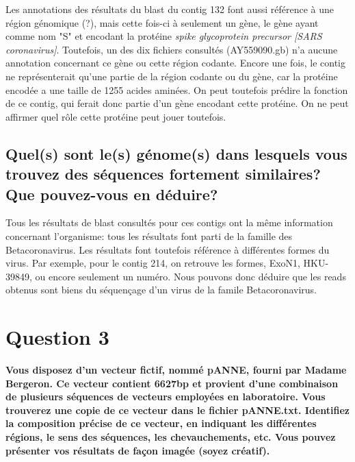 \documentclass[11pt]{article} %
\begin{document}
Les annotations des résultats du blast du contig 132 font aussi référence à une région génomique (?), mais cette fois-ci
à seulement un gène, le gène ayant comme nom "S" et encodant la protéine \emph{spike glycoprotein precursor [SARS coronavirus]}.
Toutefois, un des dix fichiers consultés (AY559090.gb) n'a aucune annotation concernant ce gène ou cette région codante.
Encore une fois, le contig ne représenterait qu'une partie de la région codante ou du gène, car la protéine encodée a une
taille de 1255 acides aminées. On peut toutefois prédire la fonction de ce contig, qui ferait donc partie d'un gène encodant
cette protéine. On ne peut affirmer quel rôle cette protéine peut jouer toutefois.

\subsection[Génome des séquences fortement similaires]{Quel(s) sont le(s) génome(s) dans lesquels vous trouvez des séquences
fortement similaires? Que pouvez-vous en déduire?}

Tous les résultats de blast consultés pour ces contigs ont la même information concernant l'organisme: tous les résultats
font parti de la famille des Betacoronavirus. Les résultats font toutefois référence à différentes formes du virus. Par exemple,
pour le contig 214, on retrouve les formes, ExoN1, HKU-39849, ou encore seulement un numéro. Nous pouvons donc déduire que
les reads obtenus sont biens du séquençage d'un virus de la famile Betacoronavirus.

 
\section{Question 3} %

{\bf Vous disposez d'un vecteur fictif, nommé pANNE, fourni par Madame Bergeron. Ce vecteur contient 6627bp et provient
d'une combinaison de plusieurs séquences de vecteurs employées en laboratoire. Vous trouverez une copie de ce vecteur
dans le fichier pANNE.txt. Identifiez la composition précise de ce vecteur, en indiquant les différentes régions, le
sens des séquences, les chevauchements, etc. Vous pouvez présenter vos résultats de façon imagée (soyez créatif).}
\end{document}
